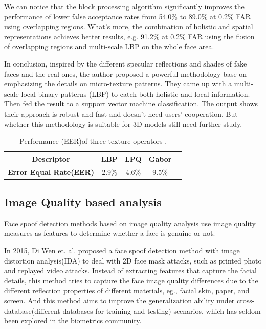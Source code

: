 \documentclass[journal]{IEEEtran}
\begin{document}
We can notice that the block processing algorithm significantly improves the performance of lower false acceptance rates from 54.0\% to 89.0\% at 0.2\% FAR using overlapping regions. What’s more, the combination of holistic and spatial representations achieves better results, e.g. 91.2\% at 0.2\% \cite{maatta2011face} FAR using the fusion of overlapping regions and multi-scale LBP on the whole face area.

In conclusion, inspired by the different specular reflections and shades of fake faces and the real ones, the author proposed a powerful methodology base on emphasizing the details on micro-texture patterns. They came up with a multi-scale local binary patterns (LBP) to catch both holistic and local information. Then fed the result to a support vector machine classification. The output shows their approach is robust and fast and doesn’t need users’ cooperation. But whether this methodology is suitable for 3D models still need further study.

\begin{table}[!htbp]
\centering
\caption{Performance (EER)of three texture operators \cite{maatta2011face}.}
\label{tab.a.1.result}
\begin{tabular}{ccccc}
\toprule
\textbf{Descriptor} & LBP & LPQ & Gabor \\
\midrule
\textbf{Error Equal Rate(EER)} & 2.9\% & 4.6\% & 9.5\% \\
\bottomrule
\end{tabular}
\end{table}





\subsection{Image Quality based analysis}

Face spoof detection methods based on image quality analysis use image quality measures as features to determine whether a face is genuine or not.

In 2015, Di Wen et. al.\cite{wen2015face} proposed a face spoof detection method with image distortion analysis(IDA) to deal with 2D face mask attacks, such as printed photo and replayed video attacks. Instead of extracting features that capture the facial details, this method tries to capture the face image quality differences due to the different reflection properties of different materials, eg., facial skin, paper, and screen. And this method aims to improve the generalization ability under cross-database(different databases for training and testing) scenarios, which has seldom been explored in the biometrics community.
\end{document}
